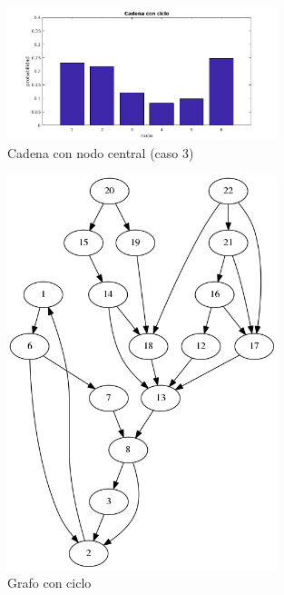 \begin{figure}[H]
  \centering
    \includegraphics[width=0.7\textwidth]{img/cadena6v3.png}
  \caption{Cadena con nodo central (caso 3)}
  \label{fig: Cadena con nodo central, con ciclo}
\end{figure}

\begin{figure}[H]
	\centering
	\includegraphics[width=0.7\textwidth]{img/links_a_ciclo_25.png}
	\caption{Grafo con ciclo}
	\label{fig: Grafo con ciclo}
\end{figure}

